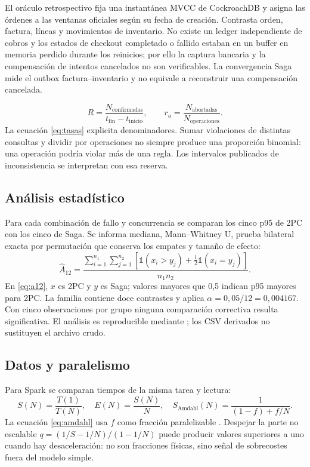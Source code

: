 \documentclass[12pt,a4paper]{article}
\begin{document}
El oráculo retrospectivo fija una instantánea MVCC de CockroachDB y asigna las órdenes a las ventanas oficiales según su fecha de creación. Contrasta orden, factura, líneas y movimientos de inventario. No existe un ledger independiente de cobros y los estados de checkout completado o fallido estaban en un buffer en memoria perdido durante los reinicios; por ello la captura bancaria y la compensación de intentos cancelados no son verificables. La convergencia Saga mide el outbox factura--inventario y no equivale a reconstruir una compensación cancelada.

\begin{equation}
R=\frac{N_{\mathrm{confirmadas}}}{t_{\mathrm{fin}}-t_{\mathrm{inicio}}},\qquad
r_a=\frac{N_{\mathrm{abortadas}}}{N_{\mathrm{operaciones}}}.
\label{eq:tasas}
\end{equation}
La ecuación \ref{eq:tasas} explicita denominadores. Sumar violaciones de distintas consultas y dividir por operaciones no siempre produce una proporción binomial: una operación podría violar más de una regla. Los intervalos publicados de inconsistencia se interpretan con esa reserva.

\subsection{Análisis estadístico}
Para cada combinación de fallo y concurrencia se comparan los cinco p95 de 2PC con los cinco de Saga. Se informa mediana, Mann--Whitney U, prueba bilateral exacta por permutación que conserva los empates y tamaño de efecto:
\begin{equation}
\widehat A_{12}=
\frac{\sum_{i=1}^{n_1}\sum_{j=1}^{n_2}
[\mathbb{1}(x_i>y_j)+\tfrac12\mathbb{1}(x_i=y_j)]}{n_1n_2}.
\label{eq:a12}
\end{equation}
En \ref{eq:a12}, \(x\) es 2PC y \(y\) es Saga; valores mayores que 0,5 indican p95 mayores para 2PC. La familia contiene doce contrastes y aplica \(\alpha=0,05/12=0,004167\). Con cinco observaciones por grupo ninguna comparación correctiva resulta significativa. El análisis es reproducible mediante ; los CSV derivados no sustituyen el archivo crudo.

\subsection{Datos y paralelismo}
Para Spark se comparan tiempos de la misma tarea y lectura:
\begin{equation}
S(N)=\frac{T(1)}{T(N)},\quad E(N)=\frac{S(N)}{N},\quad
S_{\mathrm{Amdahl}}(N)=\frac{1}{(1-f)+f/N}.
\label{eq:amdahl}
\end{equation}
La ecuación \ref{eq:amdahl} usa \(f\) como fracción paralelizable \cite{amdahl1967validity}. Despejar la parte no escalable \(q=(1/S-1/N)/(1-1/N)\) puede producir valores superiores a uno cuando hay desaceleración: no son fracciones físicas, sino señal de sobrecostes fuera del modelo simple.
\end{document}
